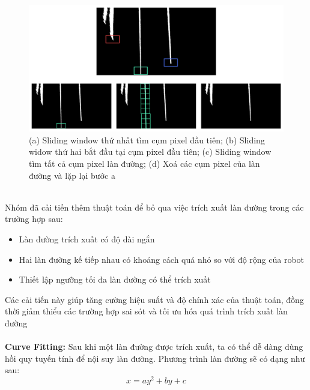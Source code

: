 \begin{figure}[!hbt]
\begin{center}
    \includegraphics[width=15cm]{img/4_Implement/sliding_window/fitting.png}
    \caption{(a) Sliding window thứ nhất tìm cụm pixel đầu tiên; (b) Sliding widow thứ hai bắt đầu tại cụm pixel đầu tiên; (c) Sliding window tìm tất cả cụm pixel làn đường; (d) Xoá các cụm pixel của làn đường và lặp lại bước a}
\end{center}
\end{figure}\\
Nhóm đã cải tiến thêm thuật toán để bỏ qua việc trích xuất làn đường trong các trường hợp sau:
\begin{itemize}
    \item Làn đường trích xuất có độ dài ngắn
    \item Hai làn đường kế tiếp nhau có khoảng cách quá nhỏ so với độ rộng của robot
    \item Thiết lập ngưỡng tối đa làn đường có thể trích xuất
\end{itemize}
Các cải tiến này giúp tăng cường hiệu suất và độ chính xác của thuật toán, đồng thời giảm thiểu các trường hợp sai sót và tối ưu hóa quá trình trích xuất làn đường\\\\
\textbf{Curve Fitting:}
Sau khi một làn đường được trích xuất, ta có thể dễ dàng dùng hồi quy tuyến tính để nội suy làn đường. Phương trình làn đường sẽ có dạng như sau:
\begin{equation}
    x = ay^2 + by + c
\end{equation}
